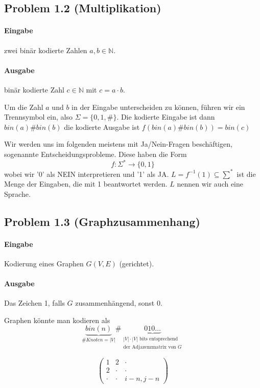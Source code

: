 \subsection*{Problem 1.2 (Multiplikation)}
\paragraph*{Eingabe} zwei binär kodierte Zahlen $a,b \in \mathbb{N}$.
\paragraph*{Ausgabe} binär kodierte Zahl $c \in \mathbb{N}$ mit $c=a \cdot b$.

\par\medskip
Um die Zahl $a$ und $b$ in der Eingabe unterscheiden zu können, führen wir ein Trennsymbol ein, also $\Sigma = \{ 0,1,\# \}$. Die kodierte Eingabe ist dann $bin(a)\#bin(b)$ die kodierte Ausgabe ist $f(bin(a)\#bin(b))=bin(c)$
\par\bigskip
Wir werden uns im folgenden meistens mit Ja/Nein-Fragen beschäftigen, sogenannte Entscheidungsprobleme. Diese haben die Form $$ f:\Sigma^* \rightarrow \{ 0,1 \} $$ wobei wir '0' als NEIN interpretieren und '1' als JA. $ L=f^{-1}(1) \subseteq \sum^* $ ist die Menge der Eingaben, die mit 1 beantwortet werden. $L$ nennen wir auch eine Sprache.
\par\medskip

\subsection*{Problem 1.3 (Graphzusammenhang)}
\paragraph*{Eingabe} Kodierung eines Graphen $G(V,E)$ (gerichtet).
\paragraph*{Ausgabe} Das Zeichen 1, falls $G$ zusammenhängend, sonst 0.

\par\medskip Graphen könnte man kodieren als $$ \underbrace{bin(n)}_{\# Knoten = |V|}\# \underbrace{010 \dots}_{\substack{|V| \cdot |V| \text{ bits entsprechend} \\ \text{der Adjazenzmatrix von } G} } $$

$$ \begin{pmatrix}
1 & 2 & \cdot \\
2 & \cdot & \cdot \\
\cdot & \cdot & i-n,j-n
\end{pmatrix} $$

